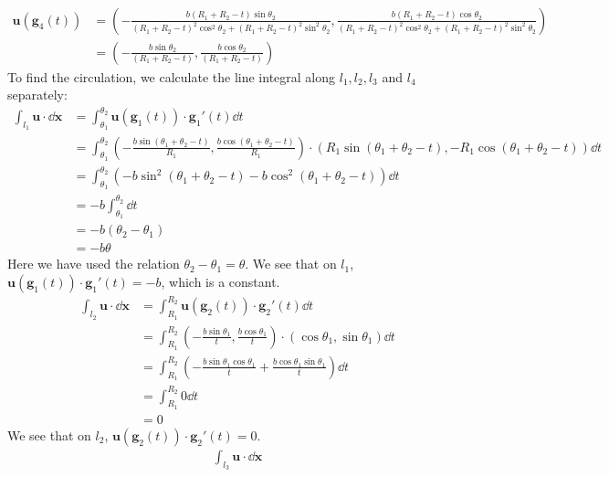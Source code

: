 \documentclass{article}
\begin{document}
\begin{enumerate}
\begin{enumerate}
\begin{align*}
   \end{align*}
   \begin{align*}
     \mathbf{u}(\mathbf{g}_4(t))
     &=  \left(-\frac{b (R_1+R_2-t)\sin\theta_2}{(R_1+R_2-t)^2\cos^2\theta_2+(R_1+R_2-t)^2\sin^2\theta_2},
     \frac{b (R_1+R_2-t)\cos\theta_2}{(R_1+R_2-t)^2\cos^2\theta_2+(R_1+R_2-t)^2\sin^2\theta_2} \right)\\
     &= \left(-\frac{b\sin\theta_2}{(R_1+R_2-t) }, \frac{b\cos\theta_2}{(R_1+R_2-t) }\right)
   \end{align*}
    To find the circulation, we calculate the line integral along \(l_1,l_2,l_3\) and \(l_4\) separately:
    \begin{align*}
      \int_{l_1} \mathbf{u}\cdot \dd\mathbf{x}
      &= \int_{\theta_1}^{\theta_2} \mathbf{u}(\mathbf{g}_1(t))\cdot \mathbf{g}_1'(t) \dd t\\
      &= \int_{\theta_1}^{\theta_2} \left(-\frac{b \sin(\theta_1 + \theta_2 -t )}{R_1}, \frac{b \cos(\theta_1 + \theta_2 -t )}{R_1}\right)\cdot (R_1\sin(\theta_1 + \theta_2 -t ), -R_1\cos(\theta_1 + \theta_2 -t )) \dd t \\
      &= \int_{\theta_1}^{\theta_2} (-b \sin^2(\theta_1 + \theta_2 -t ) - b\cos^2 (\theta_1 + \theta_2 -t )) \dd t\\
      &= -b \int_{\theta_1}^{\theta_2}\dd t\\
      &= -b(\theta_2-\theta_1) \\
      &= -b\theta
    \end{align*}
    Here we have used the relation \(\theta_2-\theta_1=\theta\). We see that on \(l_1\), \(\mathbf{u}(\mathbf{g}_1(t))\cdot \mathbf{g}_1'(t) = -b\), which is a constant.
    \begin{align*}
      \int_{l_2} \mathbf{u}\cdot \dd\mathbf{x}
      &= \int_{R_1}^{R_2} \mathbf{u}(\mathbf{g}_2(t))\cdot \mathbf{g}_2'(t) \dd t\\
      &= \int_{R_1}^{R_2} \left(-\frac{b\sin\theta_1}{t}, \frac{b\cos\theta_1}{t}\right)\cdot (\cos\theta_1, \sin\theta_1) \dd t\\
      &= \int_{R_1}^{R_2} \left( -\frac{b\sin\theta_1\cos\theta_1}{t} + \frac{b\cos\theta_1\sin\theta_1}{t}\right)\dd t\\
      &= \int_{R_1}^{R_2} 0 \dd t\\
      &= 0
    \end{align*}
     We see that on \(l_2\), \(\mathbf{u}(\mathbf{g}_2(t))\cdot \mathbf{g}_2'(t) = 0\).
     \begin{align*}
       \int_{l_3} \mathbf{u}\cdot \dd\mathbf{x}

\end{align*}
\end{enumerate}
\end{enumerate}
\end{document}
